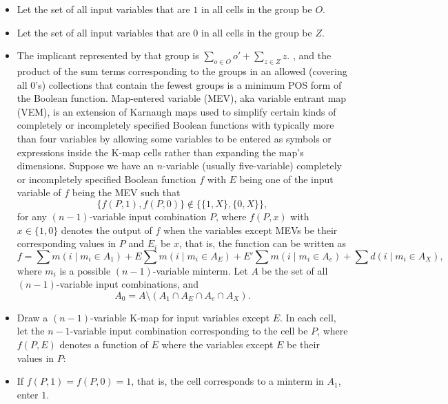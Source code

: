 \documentclass[a4paper,12pt]{article}
\begin{document}
\begin{itemize}
\begin{itemize}
\begin{itemize}
\begin{itemize}
\begin{itemize}
\begin{itemize}
\begin{itemize}
\begin{itemize}
\begin{itemize}
Yet another form is the same as the previous one but with Veitch diagram labeling and drawing two halves of boundary lines of a group surrounding two parts of a group on different maps instead of a line.
We can use K-maps to find minimum POS form of a completely or incompletely specified Boolean function by grouping $0$s instead of $1$s ($0$s and $X$s are allowed in a group), in which each group represents an implicate of $f$ by the following rules:
\ben
\item Let the set of all input variables that are $1$ in all cells in the group be $O$.
\item Let the set of all input variables that are $0$ in all cells in the group be $Z$.
\item The implicant represented by that group is $\sum_{o\in O}o'+\sum_{z\in Z}z$.
\een
, and the product of the sum terms corresponding to the groups in an allowed (covering all 0's) collections that contain the fewest groups is a minimum POS form of the Boolean function.
Map-entered variable (MEV), aka variable entrant map (VEM), is an extension of Karnaugh maps used to simplify certain kinds of completely or incompletely specified Boolean functions with typically more than four variables by allowing some variables to be entered as symbols or expressions inside the K-map cells rather than expanding the map's dimensions.
Suppose we have an $n$-variable (usually five-variable) completely or incompletely specified Boolean function $f$ with $E$ being one of the input variable of $f$ being the MEV such that
\[\{f(P,1),f(P,0)\}\notin\{\{1,X\},\{0,X\}\},\]
for any $(n-1)$-variable input combination $P$, where $f(P,x)$ with $x\in\{1,0\}$ denotes the output of $f$ when the variables except MEVs be their corresponding values in $P$ and $E_i$ be $x$, that is, the function can be written as
\[f=\sum m(i\mid m_i\in A_1)+E\sum m(i\mid m_i\in A_E)+E'\sum m(i\mid m_i\in A_e)+\sum d(i\mid m_i\in A_X),\]
where $m_i$ is a possible $(n-1)$-variable minterm. Let $A$ be the set of all $(n-1)$-variable input combinations, and
\[A_0=A\setminus(A_1\cap A_E\cap A_e\cap A_X).\]
\ben
\item Draw a $(n-1)$-variable K-map for input variables except $E$. In each cell, let the $n-1$-variable input combination corresponding to the cell be $P$, where $f(P,E)$ denotes a function of $E$ where the variables except $E$ be their values in $P$:
\bit
\item If $f(P,1)=f(P,0)=1$, that is, the cell corresponds to a minterm in $A_1$, enter $1$.

\end{itemize}
\end{itemize}
\end{itemize}
\end{itemize}
\end{itemize}
\end{itemize}
\end{itemize}
\end{itemize}
\end{itemize}
\end{document}
